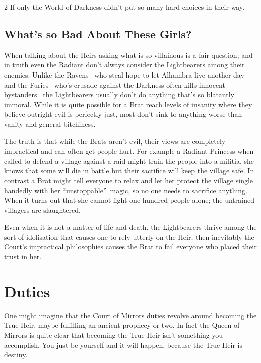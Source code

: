 \begin{multicols}{2}
If only the World of Darkness didn't put so many hard choices in their way.


\begin{mybox}

\section*{What's so Bad About These Girls?}

When talking about the Heirs asking what is so villainous is a fair question; and in truth even the Radiant don't always consider the Lightbearers among their enemies. Unlike the Ravens \textendash\, who steal hope to let Alhambra live another day \textendash\, and the Furies \textendash\, who's crusade against the Darkness often kills innocent bystanders \textendash\, the Lightbearers usually don't do anything that's so blatantly immoral. While it is quite possible for a Brat reach levels of insanity where they believe outright evil is perfectly just, most don't sink to anything worse than vanity and general bitchiness.

The truth is that while the Brats aren't evil, their views are completely impractical and can often get people hurt. For example a Radiant Princess when called to defend a village against a raid might train the people into a militia, she knows that some will die in battle but their sacrifice will keep the village safe. In contrast a Brat might tell everyone to relax and let her protect the village single handedly with her \textquotedblleft unstoppable\textquotedblright\, magic, so no one needs to sacrifice anything. When it turns out that she cannot fight one hundred people alone; the untrained villagers are slaughtered. 

Even when it is not a matter of life and death, the Lightbearers thrive among the sort of idolisation that causes one to rely utterly on the Heir; then inevitably the Court's impractical philosophies causes the Brat to fail everyone who placed their trust in her.  

\end{mybox}

\section*{Duties}

One might imagine that the Court of Mirrors duties revolve around becoming the True Heir, maybe fulfilling an ancient prophecy or two. In fact the Queen of Mirrors is quite clear that becoming the True Heir isn't something you accomplish. You just be yourself and it will happen, because the True Heir is destiny. 


\end{multicols}
